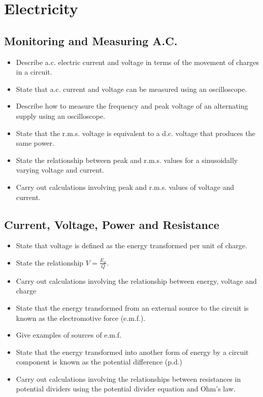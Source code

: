 \chapter{Electricity}

\section{Monitoring and Measuring A.C.}
\begin{multicols}{2}
	\begin{itemize}
        \item Describe a.c. electric current and voltage in terms of the movement of
            charges in a circuit.
        \item State that a.c. current and voltage can be measured using an
            oscilloscope.
        \item Describe how to measure the frequency and peak voltage of an
            alternating supply using an oscilloscope.
        \item State that the r.m.s. voltage is equivalent to a d.c. voltage that
            produces the same power.
        \item State the relationship between peak and r.m.s. values for a
            sinusoidally varying voltage and current.
        \item Carry out calculations involving peak and r.m.s. values of voltage and
current.
	\end{itemize}
\end{multicols}

\section{Current, Voltage, Power and Resistance}
\begin{multicols}{2}
	\begin{itemize}
        \item State that voltage is defined as the energy transformed per unit of
            charge.
        \item State the relationship $V = \frac{E_w}{Q}$.
        \item Carry out calculations involving the relationship between energy,
            voltage and charge
        \item State that the energy transformed from an external source to the
            circuit is known as the electromotive force (e.m.f.).
        \item Give examples of sources of e.m.f.
        \item State that the energy transformed into another form of energy by a
            circuit component is known as the potential difference (p.d.)
        \item Carry out calculations involving the relationships between resistances
            in potential dividers using the potential divider equation and Ohm’s
            law.
	\end{itemize}
\end{multicols}

